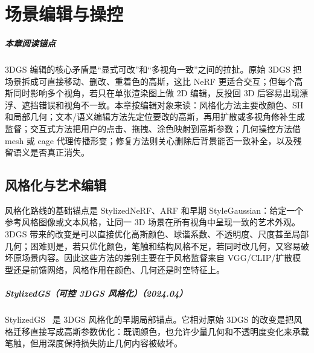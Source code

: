 \chapter{场景编辑与操控}

\paragraph*{本章阅读锚点}
3DGS 编辑的核心矛盾是“显式可改”和“多视角一致”之间的拉扯。原始 3DGS 把场景拆成可直接移动、删改、重着色的高斯，这比 NeRF 更适合交互；但每个高斯同时影响多个视角，若只在单张渲染图上做 2D 编辑，反投回 3D 后容易出现漂浮、遮挡错误和视角不一致。本章按编辑对象来读：风格化方法主要改颜色、SH 和局部几何；文本/语义编辑方法先定位要改的高斯，再用扩散或多视角修补生成监督；交互式方法把用户的点击、拖拽、涂色映射到高斯参数；几何操控方法借 mesh 或 cage 代理传播形变；修复方法则关心删除后背景能否一致补全，以及残留语义是否真正消失。

\section{风格化与艺术编辑}

风格化路线的基础锚点是 StylizedNeRF、ARF 和早期 StyleGaussian：给定一个参考风格图像或文本风格，让同一 3D 场景在所有视角中呈现一致的艺术外观。3DGS 带来的改变是可以直接优化高斯颜色、球谐系数、不透明度、尺度甚至局部几何；困难则是，若只优化颜色，笔触和结构风格不足，若同时改几何，又容易破坏原场景内容。因此这些方法的差别主要在于风格监督来自 VGG/CLIP/扩散模型还是前馈网络，风格作用在颜色、几何还是时空特征上。



\paragraph{StylizedGS（可控 3DGS 风格化）（2024.04）}
StylizedGS~\cite{2404_05220} 是 3DGS 风格化的早期局部锚点。它相对原始 3DGS 的改变是把风格迁移直接写成高斯参数优化：既调颜色，也允许少量几何和不透明度变化来承载笔触，但用深度保持损失防止几何内容被破坏。

